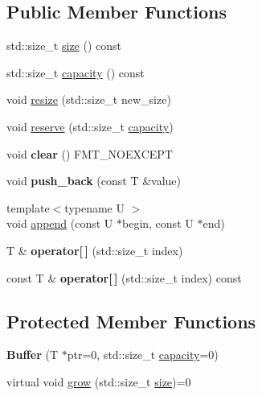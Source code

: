 \subsection*{Public Member Functions}
\begin{DoxyCompactItemize}
\item 
std\+::size\+\_\+t \hyperlink{classfmt_1_1Buffer_a14fa72f0ddf584c14ffffb1446f598aa}{size} () const 
\item 
std\+::size\+\_\+t \hyperlink{classfmt_1_1Buffer_aaf54fe786de91157629f96380e0cb215}{capacity} () const 
\item 
void \hyperlink{classfmt_1_1Buffer_a20f893164dc20e8ea8c77810d4ea8d59}{resize} (std\+::size\+\_\+t new\+\_\+size)
\item 
void \hyperlink{classfmt_1_1Buffer_a7f46a3ce8d86abe35904f6654bd4ea1e}{reserve} (std\+::size\+\_\+t \hyperlink{classfmt_1_1Buffer_aaf54fe786de91157629f96380e0cb215}{capacity})
\item 
void {\bfseries clear} () F\+M\+T\+\_\+\+N\+O\+E\+X\+C\+E\+PT\hypertarget{classfmt_1_1Buffer_a4591d21c7970ba5205680cb5224ef2b2}{}\label{classfmt_1_1Buffer_a4591d21c7970ba5205680cb5224ef2b2}

\item 
void {\bfseries push\+\_\+back} (const T \&value)\hypertarget{classfmt_1_1Buffer_a4056b71637286b41b3275e3dac57462d}{}\label{classfmt_1_1Buffer_a4056b71637286b41b3275e3dac57462d}

\item 
{\footnotesize template$<$typename U $>$ }\\void \hyperlink{classfmt_1_1Buffer_a7ca155741c43ec7c7edcea8dd28a2123}{append} (const U $\ast$begin, const U $\ast$end)
\item 
T \& {\bfseries operator\mbox{[}$\,$\mbox{]}} (std\+::size\+\_\+t index)\hypertarget{classfmt_1_1Buffer_ad1f9ad75ba08826671a78df23161685a}{}\label{classfmt_1_1Buffer_ad1f9ad75ba08826671a78df23161685a}

\item 
const T \& {\bfseries operator\mbox{[}$\,$\mbox{]}} (std\+::size\+\_\+t index) const \hypertarget{classfmt_1_1Buffer_a15dd7f9027d6c9fb0fe4b6255c9a7929}{}\label{classfmt_1_1Buffer_a15dd7f9027d6c9fb0fe4b6255c9a7929}

\end{DoxyCompactItemize}
\subsection*{Protected Member Functions}
\begin{DoxyCompactItemize}
\item 
{\bfseries Buffer} (T $\ast$ptr=0, std\+::size\+\_\+t \hyperlink{classfmt_1_1Buffer_aaf54fe786de91157629f96380e0cb215}{capacity}=0)\hypertarget{classfmt_1_1Buffer_a1830c1ba88170ed60f40f662d7f1886a}{}\label{classfmt_1_1Buffer_a1830c1ba88170ed60f40f662d7f1886a}

\item 
virtual void \hyperlink{classfmt_1_1Buffer_abdc7aaf5813aa07008b3d715969a7e19}{grow} (std\+::size\+\_\+t \hyperlink{classfmt_1_1Buffer_a14fa72f0ddf584c14ffffb1446f598aa}{size})=0
\end{DoxyCompactItemize}
